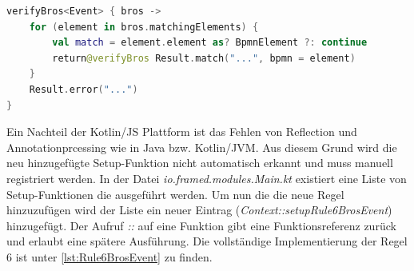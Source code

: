 \begin{lstlisting}[language=Kotlin, caption=Implementierung von Regel 6, label=lst:implementation_rule_6]
verifyBros<Event> { bros ->
    for (element in bros.matchingElements) {
        val match = element.element as? BpmnElement ?: continue
        return@verifyBros Result.match("...", bpmn = element)
    }
    Result.error("...")
}
\end{lstlisting}

Ein Nachteil der Kotlin/JS Plattform ist das Fehlen von Reflection und Annotationprcessing wie in Java bzw. Kotlin/JVM.
Aus diesem Grund wird die neu hinzugefügte Setup-Funktion nicht automatisch erkannt und muss manuell registriert werden.
In der Datei \emph{io.framed.modules.Main.kt} existiert eine Liste von Setup-Funktionen die ausgeführt werden.
Um nun die die neue Regel hinzuzufügen wird der Liste ein neuer Eintrag (\emph{Context::setupRule6BrosEvent}) hinzugefügt.
Der Aufruf \emph{::} auf eine Funktion gibt eine Funktionsreferenz zurück und erlaubt eine spätere Ausführung.
Die vollständige Implementierung der Regel 6 ist unter \cref{lst:Rule6BrosEvent} zu finden.

